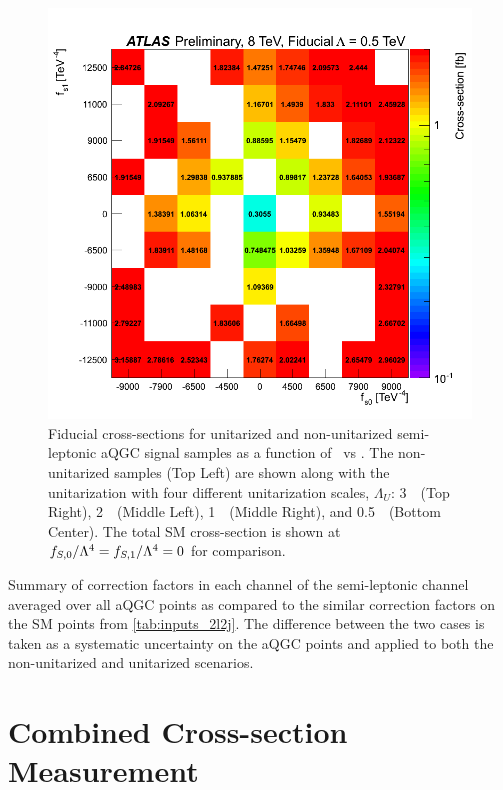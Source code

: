 \begin{figure}[ht]
\includegraphics[width=.495\textwidth]{figures/aQGC/2l2j_fiducial_p5TeV_noratio.png}
\caption{Fiducial cross-sections for unitarized and non-unitarized semi-leptonic 
aQGC signal samples as a function of \fszero~vs \fsone.
The non-unitarized samples (Top Left) are shown along with the unitarization with 
four different unitarization scales, $\Lambda_U$: 3~\TeV~(Top Right),
2~\TeV~(Middle Left), 1~\TeV~(Middle Right), and 0.5~\TeV~(Bottom Center).
The total SM cross-section is shown at $f_{S,0}/\Lambda^4=f_{S,1}/\Lambda^4=0$ for comparison.}
\label{fig:2l2j_aqgc_fiducial_xsec}
\end{figure}

\begin{table}[htb]
\centering

\caption{Summary of correction factors in each channel of the semi-leptonic channel 
averaged over all aQGC points as compared to the similar correction factors on the SM 
points from \tab\ref{tab:inputs_2l2j}. The difference between the two cases
is taken as a systematic uncertainty on the aQGC points and applied to both the 
non-unitarized and unitarized scenarios.}
\label{tab:aqgc_cfactor_2l2j_summary}
\end{table}


\section{Combined Cross-section Measurement}
\label{sec:combined_measurement}

